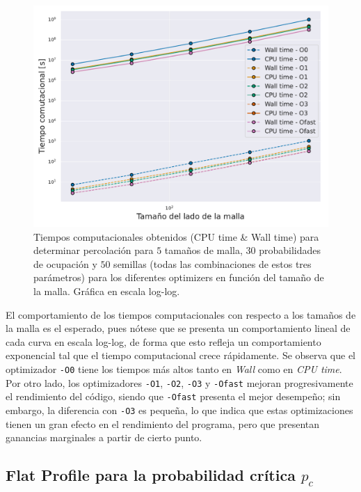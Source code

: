 \documentclass[%
 reprint,
 amsmath,amssymb,
 aps,
]{revtex4-2}
\begin{document}
\begin{figure}[H]
    \centering
    \includegraphics[width=1\linewidth]{Tiempos.pdf}
    \caption{Tiempos computacionales obtenidos (CPU time \& Wall time) para determinar percolación para $5$ tamaños de malla, $30$ probabilidades de ocupación y $50$ semillas (todas las combinaciones de estos tres parámetros) para los diferentes optimizers en función del tamaño de la malla. Gráfica en escala log-log.}
    \label{fig: tiempos}
\end{figure}

El comportamiento de los tiempos computacionales con respecto a los tamaños de la malla es el esperado, pues nótese que se presenta un comportamiento lineal de cada curva en escala log-log, de forma que esto refleja un comportamiento exponencial tal que el tiempo computacional crece rápidamente. Se observa que el optimizador \texttt{-O0} tiene los tiempos más altos tanto en \textit{Wall} como en \textit{CPU time}. Por otro lado, los optimizadores \texttt{-O1}, \texttt{-O2}, \texttt{-O3} y \texttt{-Ofast} mejoran progresivamente el rendimiento del código, siendo que \texttt{-Ofast} presenta el mejor desempeño; sin embargo, la diferencia con \texttt{-O3} es pequeña, lo que indica que estas optimizaciones tienen un gran efecto en el rendimiento del programa, pero que presentan ganancias marginales a partir de cierto punto.

\subsection{Flat Profile para la probabilidad crítica $p_c$}
\end{document}
